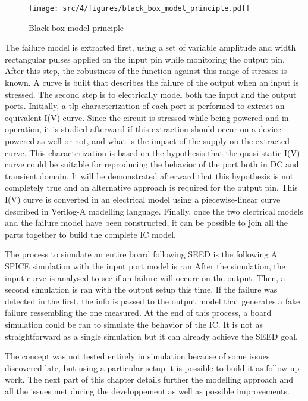 \begin{figure}[!h]
  \centering
  \texttt{[image: src/4/figures/black\_box\_model\_principle.pdf]}
  \caption{Black-box model principle}
  \label{fig:black-box-principle}
\end{figure}

The failure model is extracted first, using a set of variable amplitude and width rectangular pulses applied on the input pin while monitoring the output pin.
After this step, the robustness of the function against this range of stresses is known.
A curve is built that describes the failure of the output when an input is stressed.
The second step is to electrically model both the input and the output ports.
Initially, a \gls{tlp} characterization of each port is performed to extract an equivalent I(V) curve.
Since the circuit is stressed while being powered and in operation, it is studied afterward if this extraction should occur on a device powered as well or not, and what is the impact of the supply on the extracted curve.
This characterization is based on the hypothesis that the quasi-static I(V) curve could be suitable for reproducing the behavior of the port both in DC and transient domain.
It will be demonstrated afterward that this hypothesis is not completely true and an alternative approach is required for the output pin.
This I(V) curve is converted in an electrical model using a piecewise-linear curve described in Verilog-A modelling language.
Finally, once the two electrical models and the failure model have been constructed, it can be possible to join all the parts together to build the complete IC model.

The process to simulate an entire board following SEED is the following
A SPICE simulation with the input port model is ran
After the simulation, the input curve is analysed to see if an failure will occurr on the output.
Then, a second simulation is ran with the output setup this time.
If the failure was detected in the first, the info is passed to the output model that generates a fake failure ressembling the one measured.
At the end of this process, a board simulation could be ran to simulate the behavior of the IC.
It is not as straightforward as a single simulation but it can already achieve the SEED goal.

The concept was not tested entirely in simulation because of some issues discovered late, but using a particular setup it is possible to build it as follow-up work.
The next part of this chapter details further the modelling approach and all the issues met during the developpement as well as possible improvements.

